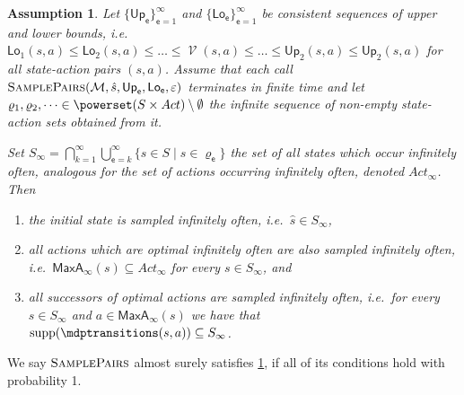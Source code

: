 \documentclass{theoretics}
\newcommand{\UnionSym}{\bigcup}
\newcommand{\IntersectionSym}{\bigcap}
\newcommand{\Union}{\UnionSym}
\newcommand{\Intersection}{\IntersectionSym}
\newcommand{\MDP}{\mathcal{M}}
\newcommand{\States}{S}
\newcommand{\initialstate}{\hat{s}}
\newcommand{\Actions}{Act}
\newcommand{\finitepath}{\varrho}
\DeclareMathOperator{\support}{supp}
\DeclareMathOperator{\val}{\mathcal{V}}
\newcommand{\upperbound}{\mathsf{Up}}
\newcommand{\lowerbound}{\mathsf{Lo}}
\newcommand{\samplepath}{\textsc{SamplePairs}}
\newcommand{\algoepisode}{\mathsf{e}}
\newcommand{\umaxactions}{\mathsf{MaxA}}
\newtheorem{assumption}{Assumption}
\begin{document}
\begin{assumption} \label{asm:brtdp_no_ec:fair}
	Let $\{\upperbound_\algoepisode\}_{\algoepisode=1}^\infty$ and $\{\lowerbound_\algoepisode\}_{\algoepisode=1}^\infty$ be consistent sequences of upper and lower bounds, i.e.\ $\lowerbound_1(s, a) \leq \lowerbound_2(s, a) \leq \dots \leq \val(s, a) \leq \dots \leq \upperbound_2(s, a) \leq \upperbound_2(s, a)$ for all state-action pairs $(s, a)$.
	Assume that each call $\samplepath(\MDP, \initialstate, \upperbound_\algoepisode, \lowerbound_\algoepisode, \varepsilon)$ terminates in finite time and let $\finitepath_1, \finitepath_2, \dots \in \powerset(\States \times \Actions) \setminus \emptyset$ the infinite sequence of non-empty state-action sets obtained from it.

	Set $\States_\infty = {\Intersection}_{k = 1}^\infty {\Union}_{\algoepisode = k}^\infty \{s \in \States \mid s \in \finitepath_{\algoepisode}\}$ the set of all states which occur infinitely often, analogous for the set of actions occurring infinitely often, denoted $\Actions_\infty$.
	Then
	\begin{enumerate}
		\item \label{asm:brtdp_no_ec:fair:initial}
		the initial state is sampled infinitely often, i.e.\ $\initialstate \in \States_\infty$,

		\item \label{asm:brtdp_no_ec:fair:actions}
		all actions which are optimal infinitely often are also sampled infinitely often, i.e.\ $\umaxactions_\infty(s) \subseteq \Actions_\infty$ for every $s \in \States_\infty$, and

		\item \label{asm:brtdp_no_ec:fair:successors}
		all successors of optimal actions are sampled infinitely often, i.e.\ for every $s \in \States_\infty$ and $a \in \umaxactions_\infty(s)$ we have that $\support(\mdptransitions(s, a)) \subseteq \States_\infty$.
	\end{enumerate}
\end{assumption}
We say $\samplepath$ almost surely satisfies \cref{asm:brtdp_no_ec:fair}, if all of its conditions hold with probability 1.
\end{document}
